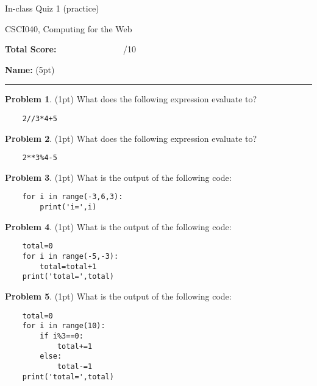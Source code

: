 \documentclass[10pt]{article}
\theoremstyle{definition}
\newtheorem{problem}{Problem}
\begin{document}
\begin{center}
    {
\Large
In-class Quiz 1 (practice)
}

    \vspace{0.1in}
CSCI040, Computing for the Web

    \vspace{0.1in}
\end{center}

\vspace{0.25in}
\noindent
\textbf{Total Score:} ~~~~~~~~~~~~~~~/10

\vspace{0.5in}
\noindent
\textbf{Name:} (5pt)

\noindent
\rule{\textwidth}{0.1pt}
\vspace{0.25in}

\begin{problem}
    (1pt)
    What does the following expression evaluate to?
\end{problem}
\begin{lstlisting}
    2//3*4+5
\end{lstlisting}
\vspace{1.5in}

\begin{problem}
    (1pt)
    What does the following expression evaluate to?
\end{problem}
\begin{lstlisting}
    2**3%4-5
\end{lstlisting}
\vspace{1.5in}

\begin{problem}
    (1pt)
    What is the output of the following code:
\end{problem}
\begin{lstlisting}
    for i in range(-3,6,3):
        print('i=',i)
\end{lstlisting}
\vspace{2in}

\begin{problem}
    (1pt)
    What is the output of the following code:
\end{problem}
\begin{lstlisting}
    total=0
    for i in range(-5,-3):
        total=total+1
    print('total=',total)
\end{lstlisting}
\vspace{2in}

\begin{problem}
    (1pt)
    What is the output of the following code:
\end{problem}
\begin{lstlisting}
    total=0
    for i in range(10):
        if i%3==0:
            total+=1
        else:
            total-=1
    print('total=',total)
\end{lstlisting}
\end{document}
